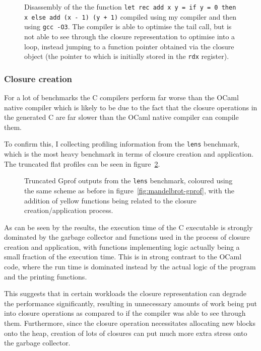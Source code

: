 \begin{figure}
    \centering
    
    \caption{Disassembly of the the function \texttt{let rec add x y = if y = 0 
    then x else add (x - 1) (y + 1)} compiled using my compiler and then using 
    \texttt{gcc -O3}. The compiler is able to optimise the tail call, but is 
    not able to see through the closure representation to optimise into a loop, 
    instead jumping to a function pointer obtained via the closure object (the 
    pointer to which is initially stored in the \texttt{rdx} register).}
    \label{fig:tail-recursion}
\end{figure}

\subsubsection{Closure creation}

For a lot of benchmarks the C compilers perform far worse than the OCaml native
compiler which is likely to be due to the fact that the closure operations in
the generated C are far slower than the OCaml native compiler can compile them.

To confirm this, I collecting profiling information from the \texttt{lens}
benchmark, which is the most heavy benchmark in terms of closure creation and
application. The truncated flat profiles can be seen in
figure~\ref{fig:closure-creation}.

\begin{figure}
    \centering
    
    \caption{Truncated Gprof outputs from the \texttt{lens} benchmark, coloured 
    using the same scheme as before in figure~\ref{fig:mandelbrot-gprof}, with 
    the addition of yellow functions being related to the closure 
    creation/application process.}
    \label{fig:closure-creation}
\end{figure}

As can be seen by the results, the execution time of the C executable is 
strongly dominated by the garbage collector and functions used in the process 
of closure creation and application, with functions implementing logic actually 
being a small fraction of the execution time. This is in strong contrast to the 
OCaml code, where the run time is dominated instead by the actual logic of the 
program and the printing functions.

This suggests that in certain workloads the closure representation can degrade 
the performance significantly, resulting in unnecessary amounts of work being 
put into closure operations as compared to if the compiler was able to see 
through them. Furthermore, since the closure operation necessitates allocating 
new blocks onto the heap, creation of lots of closures can put much more extra 
stress onto the garbage collector.

